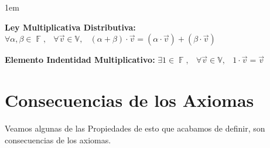 \documentclass[12pt, fleqn]{report}                             %
\newenvironment{Indentation}[1][0.75em]                         %
        {\begin{adjustwidth}{#1}{}}                                 %
        {\end{adjustwidth}}                                         %
\DeclareMathOperator \Space {\quad}                             %
\DeclareMathOperator \MiniSpace {\;}                            %
\theoremstyle{break}                                            %
\DeclareMathOperator \GenericField {\mathbb{F}}                 %
\begin{document}
\begin{Indentation}[1em]
\begin{itemize}
{                \item 
                    \textbf{Ley Multiplicativa Distributiva:}
                    $\forall \alpha, \beta \in \GenericField, \MiniSpace
                        \forall \vec{v} \in \mathbb{V}, \MiniSpace
                            (\alpha + \beta) \cdot \vec{v} = 
                                    (\alpha \cdot \vec{v}) + (\beta \cdot \vec{v})$

                \item 
                    \textbf{Elemento Indentidad Multiplicativo:}
                    $\exists 1 \in \GenericField, \MiniSpace
                        \forall \vec{v} \in \mathbb{V}, \MiniSpace 1 \cdot \vec{v} = \vec{v}$

            }
            \end{itemize}
            \end{Indentation}



        \clearpage
        \section{Consecuencias de los Axiomas}

            Veamos algunas de las Propiedades de esto que acabamos de definir, son consecuencias de los 
            axiomas.
\end{document}
